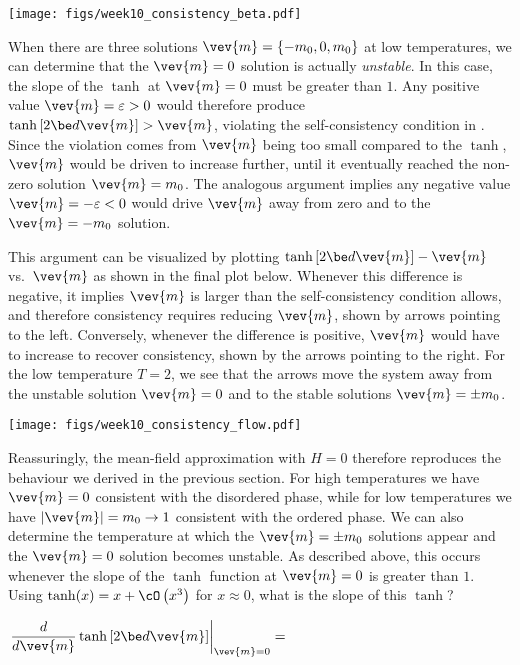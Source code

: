 \begin{center}\texttt{[image: figs/week10\_consistency\_beta.pdf]}\end{center}

When there are three solutions $\vev{m} = \left\{-m_0, 0, m_0\right\}$ at low temperatures, we can determine that the $\vev{m} = 0$ solution is actually \textit{unstable}.
In this case, the slope of the $\tanh$ at $\vev{m} = 0$ must be greater than $1$.
Any positive value $\vev{m} = \varepsilon > 0$ would therefore produce $\tanh\left[2\be d\vev{m}\right] > \vev{m}$, violating the self-consistency condition in .
Since the violation comes from $\vev{m}$ being too small compared to the $\tanh$, $\vev{m}$ would be driven to increase further, until it eventually reached the non-zero solution $\vev{m} = m_0$.
The analogous argument implies any negative value $\vev{m} = -\varepsilon < 0$ would drive $\vev{m}$ away from zero and to the $\vev{m} = -m_0$ solution.

This argument can be visualized by plotting $\tanh\left[2\be d\vev{m}\right] - \vev{m}$ vs.\ $\vev{m}$ as shown in the final plot below.
Whenever this difference is negative, it implies $\vev{m}$ is larger than the self-consistency condition allows, and therefore consistency requires reducing $\vev{m}$, shown by arrows pointing to the left.
Conversely, whenever the difference is positive, $\vev{m}$ would have to increase to recover consistency, shown by the arrows pointing to the right.
For the low temperature $T = 2$, we see that the arrows move the system away from the unstable solution $\vev{m} = 0$ and to the stable solutions $\vev{m} = \pm m_0$.

\begin{center}\texttt{[image: figs/week10\_consistency\_flow.pdf]}\end{center}

Reassuringly, the mean-field approximation with $H = 0$ therefore reproduces the behaviour we derived in the previous section.
For high temperatures we have $\vev{m} = 0$ consistent with the disordered phase, while for low temperatures we have $|\vev{m}| = m_0 \to 1$ consistent with the ordered phase.
We can also determine the temperature at which the $\vev{m} = \pm m_0$ solutions appear and the $\vev{m} = 0$ solution becomes unstable.
As described above, this occurs whenever the slope of the $\tanh$ function at $\vev{m} = 0$ is greater than $1$.
Using $\tanh(x) = x + \cO\left(x^3\right)$ for $x \approx 0$, what is the slope of this $\tanh$?
\begin{mdframed}
  $\displaystyle \left. \frac{d}{d\vev{m}} \tanh\left[2\be d\vev{m}\right]\right|_{\vev{m} = 0} = $ \\[50 pt]
\end{mdframed}


